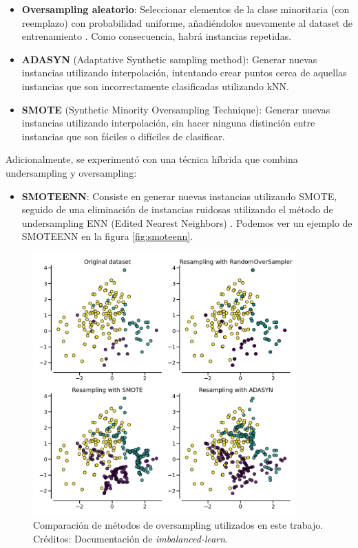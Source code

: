 \begin{itemize}
\item \textbf{Oversampling aleatorio}: Seleccionar elementos de la clase minoritaria (con reemplazo) con probabilidad uniforme, añadiéndolos nuevamente al dataset de entrenamiento \cite{Menardi2012TrainingAA}. Como consecuencia, habrá instancias repetidas.
\item \textbf{ADASYN} (Adaptative Synthetic sampling method): Generar nuevas instancias utilizando interpolación, intentando crear puntos cerca de aquellas instancias que son incorrectamente clasificadas utilizando kNN.\cite{adasyn}
\item \textbf{SMOTE} (Synthetic Minority Oversampling Technique): Generar nuevas instancias utilizando interpolación, sin hacer ninguna distinción entre instancias que son fáciles o difíciles de clasificar. \cite{smote}
\end{itemize}

Adicionalmente, se experimentó con una técnica híbrida que combina undersampling y oversampling:
\begin{itemize}
\item \textbf{SMOTEENN}: Consiste en generar nuevas instancias utilizando SMOTE, seguido de una eliminación de instancias ruidosas utilizando el método de undersampling ENN (Edited Nearest Neighbors) \cite{Batista2003BalancingTD}. Podemos ver un ejemplo de SMOTEENN en la figura \ref{fig:smoteenn}.
\end{itemize}

\begin{figure}[h!]
\centering
  \includegraphics[width=0.9\textwidth]{Kap7/oversampling_comparison.png}
\caption{ Comparación de métodos de oversampling utilizados en este trabajo. Créditos: Documentación de \textit{imbalanced-learn}.}
\label{fig:oversampling_comparison}
\end{figure}

